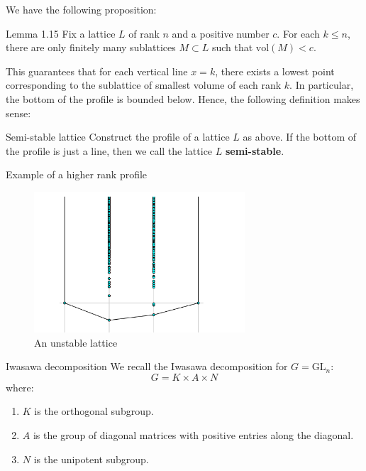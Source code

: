 \documentclass[pdf]{beamer}
\begin{document}
\begin{frame}
    We have the following proposition:
    \begin{block}{Lemma 1.15 \cite{grayson1984reduction}}
        Fix a lattice $L$ of rank $n$ and a positive number $c$. For each $k \leq n$, there are only finitely many sublattices $M \subset L$ such that
        $\text{vol}(M) < c$.
    \end{block} \pause

    This guarantees that for each vertical line $x = k$, there exists a lowest point corresponding to the sublattice of smallest volume of each rank $k$.
    In particular, the bottom of the profile is bounded below. Hence, the following definition makes sense: \pause
    \begin{block}{Semi-stable lattice}
        Construct the profile of a lattice $L$ as above. If the bottom of the profile is just a line,
        then we call the lattice $L$ \textbf{semi-stable}.
    \end{block}
\end{frame}
\begin{frame}{Example of a higher rank profile}
    \centering
    \begin{figure}
        \includegraphics[width = 0.7\textwidth]{Canonical plot 3 dim.png}
        \caption{An unstable lattice}
    \end{figure}
\end{frame}
\begin{frame}{Iwasawa decomposition}
    We recall the Iwasawa decomposition for $G = \text{GL}_n$:
    \[G = K \times A \times N\]
    where:
    \begin{enumerate}
        \item $K$ is the orthogonal subgroup.
        \item $A$ is the group of diagonal matrices with positive entries along the diagonal.
        \item $N$ is the unipotent subgroup.
    \end{enumerate}
\end{frame}
\end{document}
